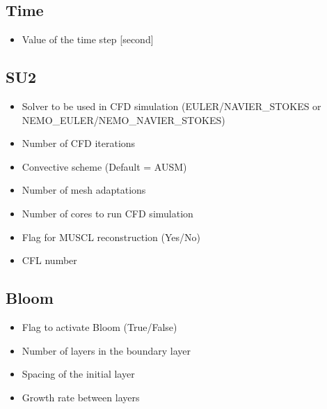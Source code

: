 \documentclass[letterpaper,10pt,english]{sphinxmanual}
\begin{document}
\subsection{Time}
\label{\detokenize{usage:time}}\begin{itemize}
\item {} 
\sphinxAtStartPar
{} \sphinxhyphen{} Value of the time step {[}second{]}

\end{itemize}


\subsection{SU2}
\label{\detokenize{usage:su2}}\begin{itemize}
\item {} 
\sphinxAtStartPar
{} \sphinxhyphen{} Solver to be used in CFD simulation (EULER/NAVIER\_STOKES or NEMO\_EULER/NEMO\_NAVIER\_STOKES)

\item {} 
\sphinxAtStartPar
{} \sphinxhyphen{} Number of CFD iterations

\item {} 
\sphinxAtStartPar
{} \sphinxhyphen{} Convective scheme (Default = AUSM)

\item {} 
\sphinxAtStartPar
{} \sphinxhyphen{} Number of mesh adaptations

\item {} 
\sphinxAtStartPar
{} \sphinxhyphen{} Number of cores to run CFD simulation

\item {} 
\sphinxAtStartPar
{} \sphinxhyphen{} Flag for MUSCL reconstruction (Yes/No)

\item {} 
\sphinxAtStartPar
{} \sphinxhyphen{} CFL number

\end{itemize}


\subsection{Bloom}
\label{\detokenize{usage:bloom}}\begin{itemize}
\item {} 
\sphinxAtStartPar
{} \sphinxhyphen{} Flag to activate Bloom (True/False)

\item {} 
\sphinxAtStartPar
{} \sphinxhyphen{} Number of layers in the boundary layer

\item {} 
\sphinxAtStartPar
{} \sphinxhyphen{} Spacing of the initial layer

\item {} 
\sphinxAtStartPar
{} \sphinxhyphen{} Growth rate between layers

\end{itemize}
\end{document}
